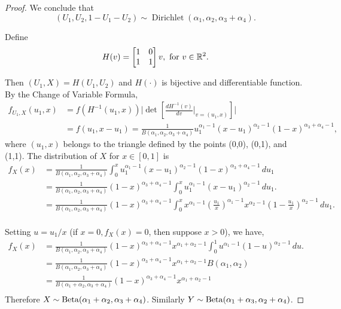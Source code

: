 \begin{proof}
We conclude that
$$(U_1, U_2, 1-U_1-U_2) \sim
\operatorname{Dirichlet}(\alpha_1,\alpha_2,\alpha_3+\alpha_4).$$

Define 
$$
H(v) = \begin{bmatrix}
  1 & 0 \\ 1 & 1
\end{bmatrix}v, \text{ for } v \in \mathbb{R}^2.
$$

Then $(U_1, X) = H(U_1, U_2)$ and $H(\cdot)$ is bijective and differentiable function. By the Change of Variable Formula, 
\begin{equation}
  \begin{split}
    f_{U_1, X}(u_1, x) &= f({H^{-1}(u_1,x)})\bigg|\det\left[\frac{dH^{-1}(v)}{dv}\bigg|_{v=(u_1,x)}\right]\bigg| \\ 
    &= f(u_1, x - u_1) = \frac{1}{B(\alpha_1, \alpha_2, \alpha_3+\alpha_4)}u_1^{\alpha_1-1}(x-u_1)^{\alpha_2-1}(1-x)^{\alpha_3+\alpha_4-1}, 
  \end{split}
\end{equation}
where $(u_1, x)$ belongs to the triangle defined by the points (0,0),
(0,1), and (1,1). The distribution of $X$ for $x \in [0,1]$ is
\begin{equation}
  \begin{split}
    f_X(x) &= \frac{1}{B(\alpha_1, \alpha_2, \alpha_3+\alpha_4)}\int_{0}^{x} u_1^{\alpha_1-1}(x-u_1)^{\alpha_2-1}(1-x)^{\alpha_3+\alpha_4-1} \, du_1 \\
    &= \frac{1}{B(\alpha_1, \alpha_2, \alpha_3+\alpha_4)}(1-x)^{\alpha_3+\alpha_4-1} \int_{0}^{x} u_1^{\alpha_1-1}(x-u_1)^{\alpha_2-1} \, du_1. \\
    &= \frac{1}{B(\alpha_1, \alpha_2, \alpha_3+\alpha_4)}(1-x)^{\alpha_3+\alpha_4-1} \int_{0}^{x} x^{\alpha_1-1} \left(\frac{u_1}{x}\right)^{\alpha_1-1}x^{\alpha_2 - 1}\left(1-\frac{u_1}{x}\right)^{\alpha_2-1} \, du_1. \\
  \end{split}
\end{equation}

Setting $u = u_1/x$ (if $x = 0, f_X(x) = 0$, then suppose $x > 0$), we have, 
\begin{equation}
  \begin{split}
    f_X(x) &= \frac{1}{B(\alpha_1, \alpha_2, \alpha_3+\alpha_4)}(1-x)^{\alpha_3+\alpha_4-1} x^{\alpha_1+\alpha_2-1} \int_{0}^{1} u^{\alpha_1-1}(1-u)^{\alpha_2-1} \, du. \\
    &= \frac{1}{B(\alpha_1, \alpha_2, \alpha_3+\alpha_4)}(1-x)^{\alpha_3+\alpha_4-1} x^{\alpha_1+\alpha_2-1} B(\alpha_1, \alpha_2)\\
    &= \frac{1}{B(\alpha_1 + \alpha_2, \alpha_3+\alpha_4)}(1-x)^{\alpha_3+\alpha_4-1} x^{\alpha_1+\alpha_2-1}\\
  \end{split}
\end{equation}
Therefore $X \sim \operatorname{Beta}(\alpha_1+\alpha_2, \alpha_3+\alpha_4)$. Similarly $Y \sim \operatorname{Beta}(\alpha_1+\alpha_3, \alpha_2 + \alpha_4)$.

\end{proof}

